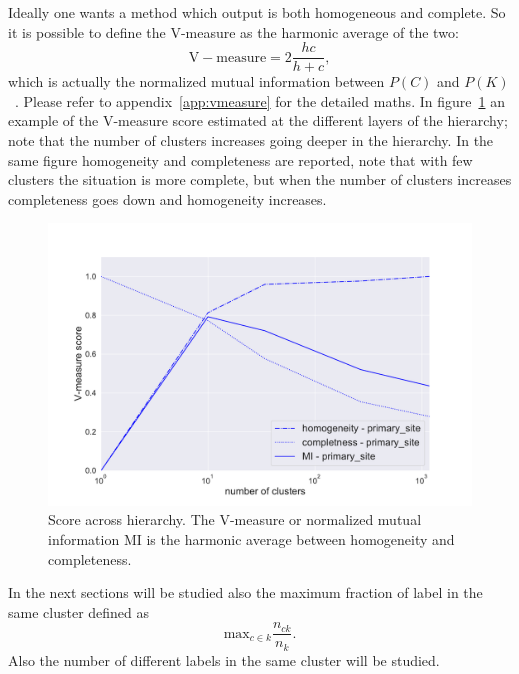 Ideally one wants a method which output is both homogeneous and complete. So it is possible to define the V-measure as the harmonic average of the two:
\begin{equation}\label{eq:mutualinformation}
    \mathrm{V-measure}=2\frac{h c}{h + c},
\end{equation}
which is actually the normalized mutual information between $P(C)$ and $P(K)$~\cite{rosenberg2007v}. Please refer to appendix~\ref{app:vmeasure} for the detailed maths. In figure~\ref{fig:topic/metric_scores_primarysite} an example of the V-measure score estimated at the different layers of the hierarchy; note that the number of clusters increases going deeper in the hierarchy. In the same figure homogeneity and completeness are reported, note that with few clusters the situation is more complete, but when the number of clusters increases completeness goes down and homogeneity increases. 
\begin{figure}[htb!]
    \centering
    \includegraphics[width=0.8\linewidth]{pictures/topic/gtex/oversigma_10tissue/metric_scores_primarysite.pdf}
    \caption{Score across hierarchy. The V-measure or normalized mutual information MI is the harmonic average between homogeneity and completeness.}
    \label{fig:topic/metric_scores_primarysite}
\end{figure}

In the next sections will be studied also the maximum fraction of label in the same cluster defined as 
\[\mathrm{max}_{c\in k}\frac{n_{c k}}{n_k}.\] Also the number of different labels in the same cluster will be studied.
\FloatBarrier